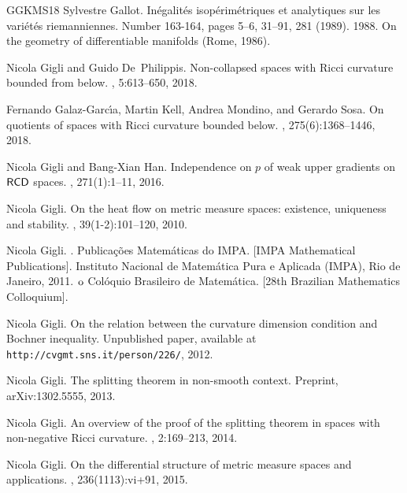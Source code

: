 \documentclass[11pt]{article}
\numberwithin{equation}{section}
\begin{document}
{\begin{thebibliography}{GGKMS18}
Sylvestre Gallot.
\newblock In\'{e}galit\'{e}s isop\'{e}rim\'{e}triques et analytiques sur les
  vari\'{e}t\'{e}s riemanniennes.
\newblock Number 163-164, pages 5--6, 31--91, 281 (1989). 1988.
\newblock On the geometry of differentiable manifolds (Rome, 1986).

Nicola Gigli and Guido De~Philippis.
\newblock Non-collapsed spaces with {R}icci curvature bounded from below.
, 5:613--650, 2018.

Fernando Galaz-Garc\'{\i}a, Martin Kell, Andrea Mondino, and Gerardo Sosa.
\newblock On quotients of spaces with {R}icci curvature bounded below.
, 275(6):1368--1446, 2018.

Nicola Gigli and Bang-Xian Han.
\newblock Independence on {$p$} of weak upper gradients on {$\sf{RCD}$} spaces.
, 271(1):1--11, 2016.

Nicola Gigli.
\newblock On the heat flow on metric measure spaces: existence, uniqueness and
  stability.
, 39(1-2):101--120, 2010.

Nicola Gigli.
.
\newblock Publica\c{c}\~{o}es Matem\'{a}ticas do IMPA. [IMPA Mathematical
  Publications]. Instituto Nacional de Matem\'{a}tica Pura e Aplicada (IMPA),
  Rio de Janeiro, 2011.
${^{{}}{\rm{o}}}$ Col\'{o}quio Brasileiro de Matem\'{a}tica. [28th
  Brazilian Mathematics Colloquium].

Nicola Gigli.
\newblock On the relation between the curvature dimension condition and
  {B}ochner inequality.
\newblock Unpublished paper, available at
  \texttt{http://cvgmt.sns.it/person/226/}, 2012.

Nicola Gigli.
\newblock The splitting theorem in non-smooth context.
\newblock Preprint, arXiv:1302.5555, 2013.

Nicola Gigli.
\newblock An overview of the proof of the splitting theorem in spaces with
  non-negative {R}icci curvature.
, 2:169--213, 2014.

Nicola Gigli.
\newblock On the differential structure of metric measure spaces and
  applications.
, 236(1113):vi+91, 2015.


\end{thebibliography}}
\end{document}
